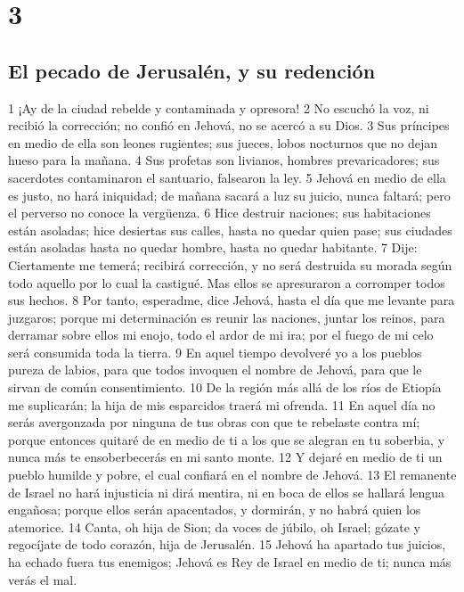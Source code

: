 \chapter{3}

\section*{El pecado de Jerusalén, y su redención}

1 ¡Ay de la ciudad rebelde y contaminada y opresora!
2 No escuchó la voz, ni recibió la corrección; no confió en Jehová, no se acercó a su Dios.
3 Sus príncipes en medio de ella son leones rugientes; sus jueces, lobos nocturnos que no dejan hueso para la mañana.
4 Sus profetas son livianos, hombres prevaricadores; sus sacerdotes contaminaron el santuario, falsearon la ley.
5 Jehová en medio de ella es justo, no hará iniquidad; de mañana sacará a luz su juicio, nunca faltará; pero el perverso no conoce la vergüenza.
6 Hice destruir naciones; sus habitaciones están asoladas; hice desiertas sus calles, hasta no quedar quien pase; sus ciudades están asoladas hasta no quedar hombre, hasta no quedar habitante.
7 Dije: Ciertamente me temerá; recibirá corrección, y no será destruida su morada según todo aquello por lo cual la castigué. Mas ellos se apresuraron a corromper todos sus hechos. 
8 Por tanto, esperadme, dice Jehová, hasta el día que me levante para juzgaros; porque mi determinación es reunir las naciones, juntar los reinos, para derramar sobre ellos mi enojo, todo el ardor de mi ira; por el fuego de mi celo será consumida toda la tierra.
9 En aquel tiempo devolveré yo a los pueblos pureza de labios, para que todos invoquen el nombre de Jehová, para que le sirvan de común consentimiento.
10 De la región más allá de los ríos de Etiopía me suplicarán; la hija de mis esparcidos traerá mi ofrenda.
11 En aquel día no serás avergonzada por ninguna de tus obras con que te rebelaste contra mí; porque entonces quitaré de en medio de ti a los que se alegran en tu soberbia, y nunca más te ensoberbecerás en mi santo monte.
12 Y dejaré en medio de ti un pueblo humilde y pobre, el cual confiará en el nombre de Jehová.
13 El remanente de Israel no hará injusticia ni dirá mentira, ni en boca de ellos se hallará lengua engañosa; porque ellos serán apacentados, y dormirán, y no habrá quien los atemorice.
14 Canta, oh hija de Sion; da voces de júbilo, oh Israel; gózate y regocíjate de todo corazón, hija de Jerusalén.
15 Jehová ha apartado tus juicios, ha echado fuera tus enemigos; Jehová es Rey de Israel en medio de ti; nunca más verás el mal.
